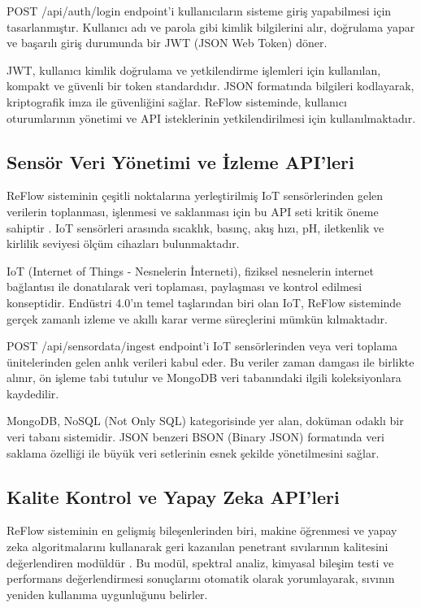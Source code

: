 \documentclass[12pt,a4paper]{article}
\begin{document}
POST /api/auth/login endpoint'i kullanıcıların sisteme giriş yapabilmesi için tasarlanmıştır. Kullanıcı adı ve parola gibi kimlik bilgilerini alır, doğrulama yapar ve başarılı giriş durumunda bir JWT (JSON Web Token) döner.

JWT, kullanıcı kimlik doğrulama ve yetkilendirme işlemleri için kullanılan, kompakt ve güvenli bir token standardıdır. JSON formatında bilgileri kodlayarak, kriptografik imza ile güvenliğini sağlar. ReFlow sisteminde, kullanıcı oturumlarının yönetimi ve API isteklerinin yetkilendirilmesi için kullanılmaktadır.

\subsection{Sensör Veri Yönetimi ve İzleme API'leri}

ReFlow sisteminin çeşitli noktalarına yerleştirilmiş IoT sensörlerinden gelen verilerin toplanması, işlenmesi ve saklanması için bu API seti kritik öneme sahiptir \cite{mineraud2016gap}. IoT sensörleri arasında sıcaklık, basınç, akış hızı, pH, iletkenlik ve kirlilik seviyesi ölçüm cihazları bulunmaktadır.

IoT (Internet of Things - Nesnelerin İnterneti), fiziksel nesnelerin internet bağlantısı ile donatılarak veri toplaması, paylaşması ve kontrol edilmesi konseptidir. Endüstri 4.0'ın temel taşlarından biri olan IoT, ReFlow sisteminde gerçek zamanlı izleme ve akıllı karar verme süreçlerini mümkün kılmaktadır.

POST /api/sensordata/ingest endpoint'i IoT sensörlerinden veya veri toplama ünitelerinden gelen anlık verileri kabul eder. Bu veriler zaman damgası ile birlikte alınır, ön işleme tabi tutulur ve MongoDB veri tabanındaki ilgili koleksiyonlara kaydedilir.

MongoDB, NoSQL (Not Only SQL) kategorisinde yer alan, doküman odaklı bir veri tabanı sistemidir. JSON benzeri BSON (Binary JSON) formatında veri saklama özelliği ile büyük veri setlerinin esnek şekilde yönetilmesini sağlar.

\subsection{Kalite Kontrol ve Yapay Zeka API'leri}

ReFlow sisteminin en gelişmiş bileşenlerinden biri, makine öğrenmesi ve yapay zeka algoritmalarını kullanarak geri kazanılan penetrant sıvılarının kalitesini değerlendiren modüldür \cite{petrov2021ai}. Bu modül, spektral analiz, kimyasal bileşim testi ve performans değerlendirmesi sonuçlarını otomatik olarak yorumlayarak, sıvının yeniden kullanıma uygunluğunu belirler.
\end{document}
